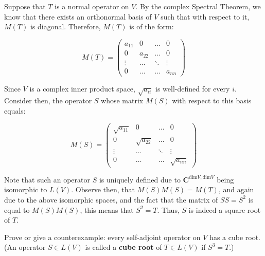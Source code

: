 \begin{solution}

    Suppose that $T$ is a normal operator on $V$. By the complex Spectral Theorem, we know that there exists an orthonormal basis of $V$ such that with respect to it, $M(T)$ is diagonal. Therefore, $M(T)$ is of the form:
    
    $$M(T) = \begin{pmatrix} a_{11} & 0 & \ldots & 0 \\ 0 & a_{22} & \ldots & 0 \\ \vdots & \ldots & \ddots  & \vdots \\ 0 & \ldots & \ldots & a_{nn} \end{pmatrix}$$

    Since $V$ is a complex inner product space, $\sqrt{a_{ii}}$ is well-defined for every $i$. Consider then, the operator $S$ whose matrix $M(S)$ with respect to this basis equals:

    $$M(S) = \begin{pmatrix} \sqrt{a_{11}} & 0 & \ldots & 0 \\ 0 & \sqrt{a_{22}} & \ldots & 0 \\ \vdots & \ldots & \ddots  & \vdots \\ 0 & \ldots & \ldots & \sqrt{a_{nn}} \end{pmatrix}$$

    Note that such an operator $S$ is uniquely defined due to $\mathbf{C}^{\text{dim} V, \text{dim} V}$ being isomorphic to $L(V)$. Observe then, that $M(S)M(S) = M(T)$, and again due to the above isomorphic spaces, and the fact that the matrix of $SS = S^2$ is equal to $M(S)M(S)$, this means that $S^2 = T$. Thus, $S$ is indeed a square root of $T$.
\end{solution}

\begin{exercise}{11}
    Prove or give a counterexample: every self-adjoint operator on $V$ has a cube root. (An operator $S \in L(V)$ is called a \textbf{cube root} of $T \in L(V)$ if $S^3=T$.)
\end{exercise}

